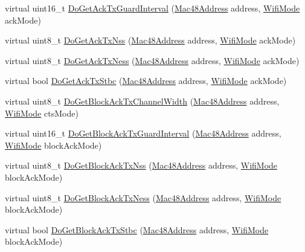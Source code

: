 \begin{DoxyCompactItemize}
\item 
virtual uint16\+\_\+t \hyperlink{classns3_1_1WifiRemoteStationManager_a54d78583060c763863cf21a180bab0e6}{Do\+Get\+Ack\+Tx\+Guard\+Interval} (\hyperlink{classns3_1_1Mac48Address}{Mac48\+Address} address, \hyperlink{classns3_1_1WifiMode}{Wifi\+Mode} ack\+Mode)
\item 
virtual uint8\+\_\+t \hyperlink{classns3_1_1WifiRemoteStationManager_a3b3b880d70c6efd39d54029d5351f130}{Do\+Get\+Ack\+Tx\+Nss} (\hyperlink{classns3_1_1Mac48Address}{Mac48\+Address} address, \hyperlink{classns3_1_1WifiMode}{Wifi\+Mode} ack\+Mode)
\item 
virtual uint8\+\_\+t \hyperlink{classns3_1_1WifiRemoteStationManager_a46e71d30349d049f817159e886174455}{Do\+Get\+Ack\+Tx\+Ness} (\hyperlink{classns3_1_1Mac48Address}{Mac48\+Address} address, \hyperlink{classns3_1_1WifiMode}{Wifi\+Mode} ack\+Mode)
\item 
virtual bool \hyperlink{classns3_1_1WifiRemoteStationManager_a6e373493ee11736657aa46ff172842f8}{Do\+Get\+Ack\+Tx\+Stbc} (\hyperlink{classns3_1_1Mac48Address}{Mac48\+Address} address, \hyperlink{classns3_1_1WifiMode}{Wifi\+Mode} ack\+Mode)
\item 
virtual uint8\+\_\+t \hyperlink{classns3_1_1WifiRemoteStationManager_a8af98fb961e9fff0029458fe16c29be2}{Do\+Get\+Block\+Ack\+Tx\+Channel\+Width} (\hyperlink{classns3_1_1Mac48Address}{Mac48\+Address} address, \hyperlink{classns3_1_1WifiMode}{Wifi\+Mode} cts\+Mode)
\item 
virtual uint16\+\_\+t \hyperlink{classns3_1_1WifiRemoteStationManager_a13fea9269e67999897b53e552bdfcdbc}{Do\+Get\+Block\+Ack\+Tx\+Guard\+Interval} (\hyperlink{classns3_1_1Mac48Address}{Mac48\+Address} address, \hyperlink{classns3_1_1WifiMode}{Wifi\+Mode} block\+Ack\+Mode)
\item 
virtual uint8\+\_\+t \hyperlink{classns3_1_1WifiRemoteStationManager_a0571ee1cc412eedfca0a0ebb4e739aad}{Do\+Get\+Block\+Ack\+Tx\+Nss} (\hyperlink{classns3_1_1Mac48Address}{Mac48\+Address} address, \hyperlink{classns3_1_1WifiMode}{Wifi\+Mode} block\+Ack\+Mode)
\item 
virtual uint8\+\_\+t \hyperlink{classns3_1_1WifiRemoteStationManager_a153a28e3d35be03b2b805fddcf0b4c06}{Do\+Get\+Block\+Ack\+Tx\+Ness} (\hyperlink{classns3_1_1Mac48Address}{Mac48\+Address} address, \hyperlink{classns3_1_1WifiMode}{Wifi\+Mode} block\+Ack\+Mode)
\item 
virtual bool \hyperlink{classns3_1_1WifiRemoteStationManager_a6ee8ac814775d873def70f48aa88f293}{Do\+Get\+Block\+Ack\+Tx\+Stbc} (\hyperlink{classns3_1_1Mac48Address}{Mac48\+Address} address, \hyperlink{classns3_1_1WifiMode}{Wifi\+Mode} block\+Ack\+Mode)

\end{DoxyCompactItemize}
